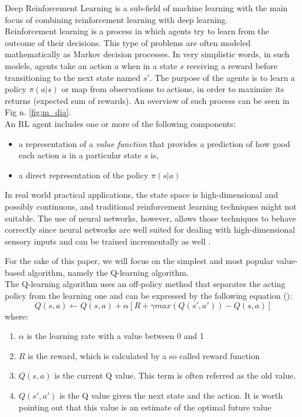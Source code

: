 \documentclass[conference]{IEEEtran}
\begin{document}
Deep Reinforcement Learning is a sub-field of machine learning with the main focus of combining reinforcement learning with deep learning. \\
Reinforcement learning is a process in which agents try to learn from the outcome of their decisions. This type of problems are often modeled mathematically as Markov decision processes. In very simplistic words, in such models, agents take an action $a$ when in a state $s$ receiving a reward before transitioning to the next state named $s'$. The purpose of the agents is to learn a policy $\pi(a|s)$ or map from observations to actions, in order to maximize its returns (expected sum of rewards)\cite{DBLP:journals/corr/Li17b}. An overview of such process can be seen in Fig n. \ref{fig:m_dia}. \\
An RL agent includes one or more of the following components:
\begin{itemize}
    \item  a representation of a \textit{value function} that provides a prediction of how good each action $a$ in a particular state $s$ is,
    \item a direct representation of the policy $\pi(s|a)$
\end{itemize}

In real world practical applications, the state space is high-dimensional and possibly continuous, and traditional reinforcement learning techniques might not suitable. The use of neural networks, however, allows those techniques to behave correctly since neural networks are well suited for dealing with high-dimensional sensory inputs and can be trained incrementally as well \cite{DBLP:journals/corr/Li17b}.



For the sake of this paper, we will focus on the simplest and most popular value-based algorithm, namely the Q-learning algorithm. \\
The Q-learning algorithm uses an off-policy method that separates the acting policy from the learning one and can be expressed by the following equation (\cite{Q_learning}):
\begin{equation}
    Q(s,a) \leftarrow Q(s,a) + \alpha [R + \gamma max( Q(s',a')) - Q(s,a)]
    \label{q_value}
\end{equation}
where:
\begin{enumerate}
    \item $\alpha$ is the learning rate with a value between 0 and 1
    \item $R$ is the reward, which is calculated by a so called reward function
    \item $Q(s,a)$ is the current Q value. This term is often referred as the old value.
    \item $Q(s',a')$ is the Q value given the next state and the action. It is worth pointing out that this value is an estimate of the optimal future value
    
\end{enumerate}
\end{document}
